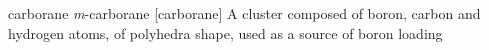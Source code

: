 \newglsXchemical%
{carborane}%
{\textsl{m}{\--}carborane}%
{}%
[carborane]%
{A cluster composed of boron, carbon and hydrogen atoms, of polyhedra shape, used as a source of boron loading}%